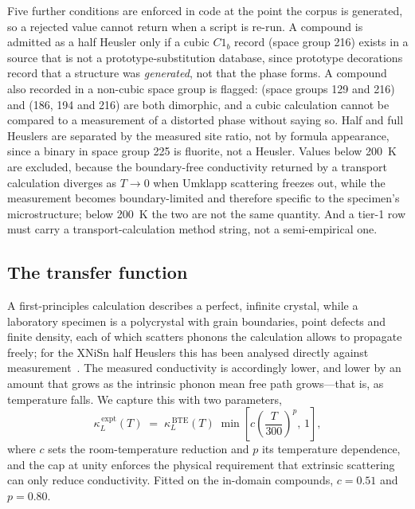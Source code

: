 Five further conditions are enforced in code at the point the corpus is generated, so a rejected
value cannot return when a script is re-run. A compound is admitted as a half Heusler only if a
cubic $C1_b$ record (space group 216) exists in a source that is not a prototype-substitution
database, since prototype decorations record that a structure was \emph{generated}, not that the
phase forms. A compound also recorded in a non-cubic space group is flagged:  (space
groups 129 and 216) and  (186, 194 and 216) are both dimorphic, and a cubic calculation
cannot be compared to a measurement of a distorted phase without saying so. Half and full Heuslers
are separated by the measured site ratio, not by formula appearance, since a binary in space
group 225 is fluorite, not a Heusler. Values below \SI{200}{\kelvin} are excluded, because the
boundary-free conductivity returned by a transport calculation diverges as $T\to 0$ when Umklapp
scattering freezes out, while the measurement becomes boundary-limited and therefore specific to
the specimen's microstructure; below \SI{200}{\kelvin} the two are not the same quantity. And a
tier-1 row must carry a transport-calculation method string, not a semi-empirical one.

\subsection{The transfer function}
\label{sec:transfer}

A first-principles calculation describes a perfect, infinite crystal, while a laboratory specimen is
a polycrystal with grain boundaries, point defects and finite density, each of which scatters
phonons the calculation allows to propagate freely; for the XNiSn half Heuslers this has been
analysed directly against measurement~\cite{schrade2017the}. The measured conductivity is
accordingly lower, and lower by an amount that grows as the intrinsic phonon mean free path
grows---that is, as temperature falls. We capture this with two parameters,
%
\begin{equation}
  \kappa_L^{\,\mathrm{expt}}(T) \;=\; \kappa_L^{\,\mathrm{BTE}}(T)\;
    \min\!\left[c\left(\frac{T}{300}\right)^{p},\,1\right],
  \label{eq:transfer}
\end{equation}
%
where $c$ sets the room-temperature reduction and $p$ its temperature dependence, and the cap at
unity enforces the physical requirement that extrinsic scattering can only reduce conductivity.
Fitted on the in-domain compounds, $c=\num{0.51}$ and $p=\num{0.80}$.

